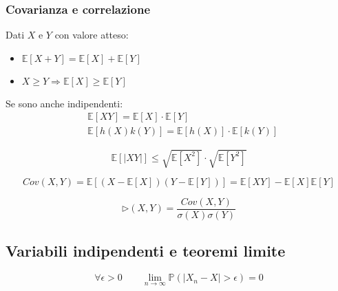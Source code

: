 \subsubsection{Covarianza e correlazione}
\begin{proposition}
	Dati $X$ e $Y$ con valore atteso:
	\begin{itemize}
		\item $\mathbb{E}[X+Y] = \mathbb{E}[X] + \mathbb{E}[Y]$ \\
		\item $X \geq Y \Longrightarrow \mathbb{E}[X] \geq \mathbb{E}[Y]$
	\end{itemize}
	Se sono anche indipendenti:
	\begin{align}
		& \mathbb{E}[XY] = \mathbb{E}[X] \cdot \mathbb{E}[Y] \\
		& \mathbb{E}[h(X)k(Y)] = \mathbb{E}[h(X)] \cdot \mathbb{E}[k(Y)] 
	\end{align}
\end{proposition}

\begin{proposition}
	\begin{equation}
		\mathbb{E}[\lvert XY \rvert] \leq \sqrt{\mathbb{E}[X^2]} \cdot \sqrt{\mathbb{E}[Y^2]}
	\end{equation}
\end{proposition}

\begin{definition}[Covarianza]
	\begin{equation}
		Cov(X,Y) = \mathbb{E}[(X - \mathbb{E}[X])(Y - \mathbb{E}[Y])] = \mathbb{E}[XY] - \mathbb{E}[X]\mathbb{E}[Y]
	\end{equation}
\end{definition}

\begin{definition}
	\begin{equation}
		\rhd(X,Y) = \frac{Cov(X,Y)}{\sigma(X)\sigma(Y)}
	\end{equation}
\end{definition}

\subsection{Variabili indipendenti e teoremi limite}
\begin{definition}
	\begin{equation}
		\forall \epsilon > 0 \quad\quad \lim_{n \to \infty} \mathbb{P}(\lvert X_n - X \rvert > \epsilon) = 0
	\end{equation}
\end{definition}